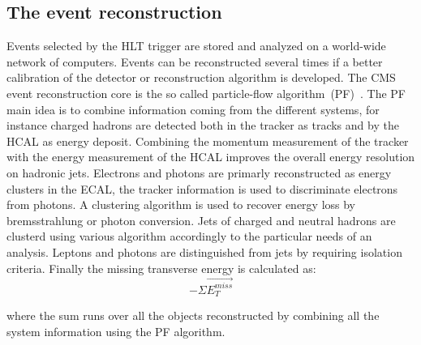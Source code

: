 \subsection{The event reconstruction}
\label{sec:cms_pf}
Events selected by the HLT trigger are stored and analyzed on a world-wide network of computers.
Events can be reconstructed several times if a better calibration of the detector or reconstruction algorithm is
developed. The CMS event reconstruction core is the so called particle-flow algorithm~(PF)~\cite{PF}. The PF main idea
is to combine information coming from the different systems, for instance charged hadrons are detected both
in the tracker as tracks and by the HCAL as energy deposit. Combining the momentum measurement of the tracker
with the energy measurement of the HCAL improves the overall energy resolution on hadronic jets.
Electrons and photons are primarly reconstructed as energy clusters in the ECAL, the tracker information is
used to discriminate electrons from photons. A clustering algorithm is used to recover energy loss by bremsstrahlung
or photon conversion.
Jets of charged and neutral hadrons are clusterd using various algorithm accordingly to the particular needs of an analysis.
Leptons and photons are distinguished from jets by requiring isolation criteria.
Finally the missing transverse energy is calculated as:
\[
  -\Sigma \vec{E_T^{miss}}
\]

where the sum runs over all the objects reconstructed by combining all the system information using the PF algorithm.